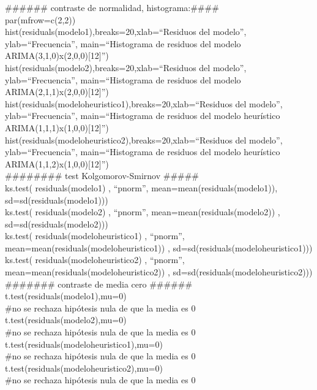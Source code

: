 \documentclass{report}
\begin{document}
\#\#\#\#\#\# contraste de normalidad, histograma:\#\#\#\# \\
par(mfrow=c(2,2))\\
hist(residuals(modelo1),breaks=20,xlab=``Residuos del modelo'',
     ylab=``Frecuencia'',
     main=``Histograma de residuos del modelo ARIMA(3,1,0)x(2,0,0)[12]'')\\
hist(residuals(modelo2),breaks=20,xlab=``Residuos del modelo'',
     ylab=``Frecuencia'',
     main=``Histograma de residuos del modelo ARIMA(2,1,1)x(2,0,0)[12]'')\\
hist(residuals(modeloheuristico1),breaks=20,xlab=``Residuos del modelo'',
     ylab=``Frecuencia'',
     main=``Histograma de residuos del modelo heurístico ARIMA(1,1,1)x(1,0,0)[12]'')\\
hist(residuals(modeloheuristico2),breaks=20,xlab=``Residuos del modelo'',
     ylab=``Frecuencia'',
     main=``Histograma de residuos del modelo heurístico ARIMA(1,1,2)x(1,0,0)[12]'')\\

\#\#\#\#\#\#\#\# test Kolgomorov-Smirnov \#\#\#\#\# \\
ks.test( residuals(modelo1) , ``pnorm'', mean=mean(residuals(modelo1)), sd=sd(residuals(modelo1)))\\
ks.test( residuals(modelo2) , ``pnorm'', mean=mean(residuals(modelo2)) , sd=sd(residuals(modelo2)))\\
ks.test( residuals(modeloheuristico1) , ``pnorm'', mean=mean(residuals(modeloheuristico1)) , sd=sd(residuals(modeloheuristico1)))\\
ks.test( residuals(modeloheuristico2) , ``pnorm'', mean=mean(residuals(modeloheuristico2)) , sd=sd(residuals(modeloheuristico2)))\\

\#\#\#\#\#\#\# contraste de media cero \#\#\#\#\#\# \\
t.test(residuals(modelo1),mu=0) \\
\#no se rechaza hipótesis nula de que la media es 0\\
t.test(residuals(modelo2),mu=0)\\
\#no se rechaza hipótesis nula de que la media es 0\\
t.test(residuals(modeloheuristico1),mu=0)\\
\#no se rechaza hipótesis nula de que la media es 0\\
t.test(residuals(modeloheuristico2),mu=0)\\
\#no se rechaza hipótesis nula de que la media es 0\\
\end{document}
